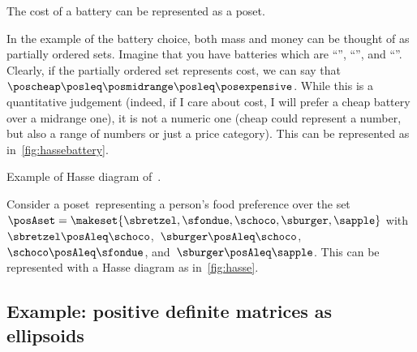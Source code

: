 \begin{example}

    \begin{marginfigure}
        \centering
        \caption{The cost of a battery can be represented as a poset.
        }
        \label{fig:hassebattery}
    \end{marginfigure}

    In the example of the battery choice, both mass and money can be thought of as partially ordered sets.
    Imagine that you have batteries which are ``\poscheap'', ``\posmidrange'', and ``\posexpensive''.
    Clearly, if the partially ordered set represents cost, we can say that~$\poscheap \posleq\posmidrange \posleq\posexpensive$.
    While this is a quantitative judgement (indeed, if I care about cost, I will prefer a cheap battery over a midrange one), it is not a numeric one (cheap could represent a number, but also a range of numbers or just a price category).
    This can be represented as in~\cref{fig:hassebattery}.
\end{example}

\begin{marginfigure}
    \centering
    \caption{Example of Hasse diagram of~\posA.}
    \label{fig:hasse}
\end{marginfigure}
\begin{example}
    Consider a poset~\posA representing a person's food preference over the set~$\posAset=\makeset{\sbretzel,\sfondue,\schoco,\sburger,\sapple}$ with~$\sbretzel\posAleq \schoco$,~$\sburger\posAleq \schoco$,~$\schoco\posAleq \sfondue$, and~$\sburger\posAleq \sapple$.
    This can be represented with a Hasse diagram as in~\cref{fig:hasse}.
\end{example}

\vfill\clearpage

\subsection{Example: positive definite matrices as ellipsoids}

\begin{marginfigure}
    \centering

    \caption{}
    \label{fig:posdef}
\end{marginfigure}

